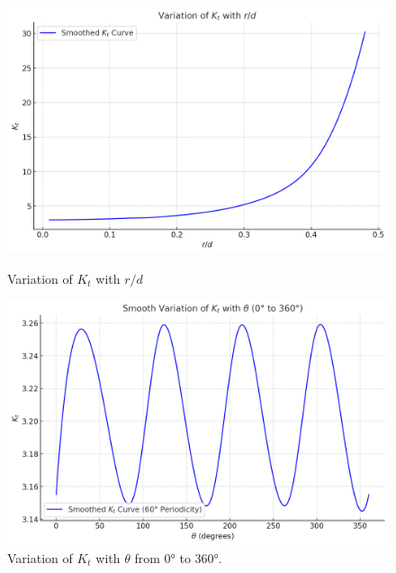\documentclass[a4paper,11pt]{article}
\begin{document}
\begin{figure}[h!]
 
    \centering
    \begin{minipage}{0.45\textwidth}
        \centering
        \includegraphics[width=\textwidth]{Variation of $K_t$ with $r:d$.png}
        \caption{Variation of \(K_t\) with \(r/d\)}
        \label{fig:Kt_vs_rd}
    \end{minipage}\hfill
    \begin{minipage}{0.45\textwidth}
        \centering
        \includegraphics[width=\textwidth]{Smooth_Variation.png}
        \caption{Variation of \(K_t\) with \(\theta\) from 0° to 360°.}
        \label{fig:Kt_vs_theta}
    \end{minipage}
\end{figure}


\FloatBarrier %
 
\end{document}
